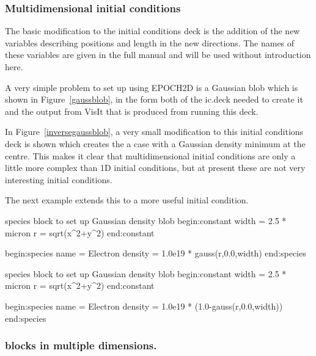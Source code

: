 \subsubsection{Multidimensional initial conditions}

The basic modification to the {\EPOCH} initial conditions deck is the addition
of the new variables describing positions and length in the new directions. The
names of these variables are given in the full manual and will be used without
introduction here.


A very simple problem to set up using EPOCH2D is a Gaussian blob which is
shown in Figure~\ref{gaussblob}, in the form both of the ic.deck needed to
create it and the output from VisIt that is produced from running this deck.


In Figure~\ref{inversegaussblob}, a very small modification to this initial
conditions deck is shown which creates the a case with a Gaussian density
minimum at the centre. This makes it clear that multidimensional initial
conditions are only a little more complex than 1D initial conditions, but at
present these are not very interesting initial conditions.

The next example extends this to a more useful initial condition.\\

\begin{nbboxverbatim}{species block to set up Gaussian density blob}
begin:constant
   width = 2.5 * micron
   r = sqrt(x^2+y^2)
end:constant

begin:species
   name = Electron
   density = 1.0e19 * gauss(r,0.0,width)
end:species
\end{nbboxverbatim}
%
\begin{nbboxverbatim}{species block to set up Gaussian density blob}
begin:constant
   width = 2.5 * micron
   r = sqrt(x^2+y^2)
end:constant

begin:species
   name = Electron
   density = 1.0e19 * (1.0-gauss(r,0.0,width))
end:species
\end{nbboxverbatim}

\subsubsection{ blocks in multiple dimensions.}
\label{sec:multilaser}

